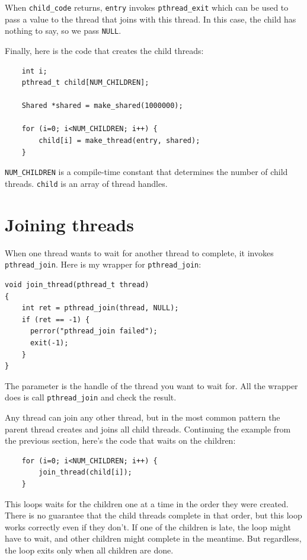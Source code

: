 \documentclass[12pt]{book}
\begin{document}
{When {\tt child\_code} returns, {\tt entry} invokes
\verb"pthread_exit" which can be used to pass a value to the thread
that joins with this thread.  In this case, the child has nothing to
say, so we pass {\tt NULL}.

Finally, here is the code that creates the child threads:

\begin{verbatim}
    int i;
    pthread_t child[NUM_CHILDREN];

    Shared *shared = make_shared(1000000);

    for (i=0; i<NUM_CHILDREN; i++) {
        child[i] = make_thread(entry, shared);
    }
\end{verbatim}

\verb"NUM_CHILDREN" is a compile-time constant that determines
the number of child threads.  {\tt child} is an array of
thread handles.


\section{Joining threads}

When one thread wants to wait for another thread to complete,
it invokes {\tt pthread\_join}.
Here is my wrapper for {\tt pthread\_join}:

\begin{verbatim}
void join_thread(pthread_t thread)
{
    int ret = pthread_join(thread, NULL);
    if (ret == -1) {
      perror("pthread_join failed");
      exit(-1);
    }
}
\end{verbatim}

The parameter is the handle of the thread you want to wait for.
All the wrapper does is call {\tt pthread\_join} and check the
result.

Any thread can join any other thread, but in the most common pattern
the parent thread creates and joins all child threads.
Continuing the example from the previous section, here's the
code that waits on the children:

\begin{verbatim}
    for (i=0; i<NUM_CHILDREN; i++) {
        join_thread(child[i]);
    }
\end{verbatim}

This loops waits for the children one at a time in the order they
were created.  There is no guarantee that the child threads complete 
in that order, but this loop works correctly even if they don't.  If one
of the children is late, the loop might have to wait, and other children
might complete in the meantime.  But regardless, the loop exits
only when all children are done.

}
\end{document}
